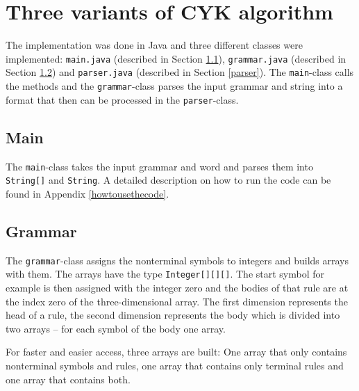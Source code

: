\documentclass[a4paper, 11pt]{article}
\begin{document}
\section{Three variants of CYK algorithm}
\label{systemdesign}

The implementation was done in Java and three different classes were implemented: \texttt{main.java} (described in Section \ref{main}), \texttt{grammar.java} (described in Section \ref{grammar}) and \texttt{parser.java} (described in Section \ref{parser}). The \texttt{main}-class calls the methods and the \texttt{grammar}-class parses the input grammar and string into a format that then can be processed in the \texttt{parser}-class.





\subsection{Main}
\label{main}

The \texttt{main}-class takes the input grammar and word and parses them into \texttt{String[]} and \texttt{String}. 
A detailed description on how to run the code can be found in Appendix \ref{howtousethecode}.



\subsection{Grammar}
\label{grammar}


The \texttt{grammar}-class assigns the nonterminal symbols to integers and builds arrays with them. The arrays have the type \texttt{Integer[][][]}. The start symbol for example is then assigned with the integer zero and the bodies of that rule are at the index zero of the three-dimensional array. The first dimension represents the head of a rule, the second dimension represents the body which is divided into two arrays -- for each symbol of the body one array.


For faster and easier access, three arrays are built: One array that only contains nonterminal symbols and rules, one array that contains only terminal rules and one array that contains both.
\end{document}
